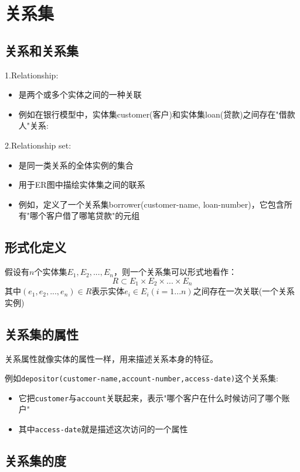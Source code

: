 \section{关系集}

\subsection{关系和关系集}

1.Relationship:
\begin{itemize}
    \item 是两个或多个实体之间的一种关联
    \item 例如在银行模型中，实体集customer(客户)和实体集loan(贷款)之间存在"借款人"关系:
\end{itemize}

2.Relationship set:
\begin{itemize}
    \item 是同一类关系的全体实例的集合
    \item 用于ER图中描绘实体集之间的联系
    \item 例如，定义了一个关系集borrower(customer-name, loan-number)，它包含所有"哪个客户借了哪笔贷款"的元组
\end{itemize}

\subsection{形式化定义}

假设有$n$个实体集$E_1,E_2,...,E_n$，则一个关系集可以形式地看作：
$$R\subset E_1\times E_2\times ...\times E_n$$
其中$(e_1,e_2,...,e_n)\in R$表示实体$e_i\in E_i(i=1...n)$之间存在一次关联(一个关系实例)

\subsection{关系集的属性}

关系属性就像实体的属性一样，用来描述关系本身的特征。

例如\texttt{depositor(customer-name,account-number,access-date)}这个关系集:
\begin{itemize}
    \item 它把\texttt{customer}与\texttt{account}关联起来，表示"哪个客户在什么时候访问了哪个账户"
    \item 其中\texttt{access-date}就是描述这次访问的一个属性
\end{itemize}

\subsection{关系集的度}

